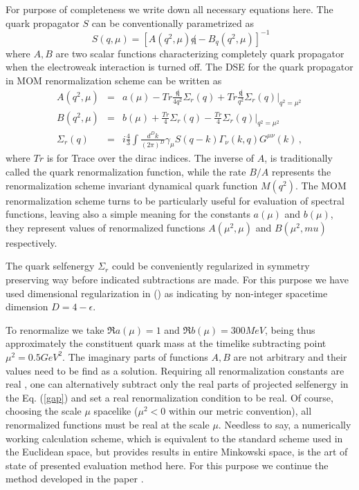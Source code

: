 \documentclass[aps,prd,superscriptaddress,eqsecnum,amsfonts,showpacs,epsfig]{revtex4}
\newcommand{\be}{\begin{equation}}
\newcommand{\ee}{\end{equation}}
\newcommand{\bea}{\begin{eqnarray}}
\newcommand{\eea}{\end{eqnarray}}
\newcommand{\nn}{\nonumber}
\begin{document}
 For purpose of completeness we write down all necessary equations here. 
The  quark propagator $S$ can be conventionally parametrized as
\be   \
S(q,\mu)=[A(q^2,\mu)\not q- B_q(q^2,\mu)]^{-1}
\ee
where  $A,B$ are two scalar functions characterizing completely  quark propagator when 
the electroweak interaction is turned off.
The DSE for the quark propagator in MOM renormalization scheme can be  written as
%
\bea  
A(q^2,\mu)&=&a(\mu)-Tr \frac{\not q}{4q^2}\Sigma_r(q)+ Tr \frac{\not q}{q^2}\Sigma_r(q)|_{q^2=\mu^2}
\nn \\
B(q^2,\mu)&=&b(\mu)+\frac{Tr}{4}\Sigma_r(q)- \frac{Tr}{4} \Sigma_r(q)|_{q^2=\mu^2}
\nn \\
 \label{gap}
\Sigma_r(q)&=&i\frac{4}{3}\int\frac{d^D k}{(2\pi)^D
} \gamma_{\mu} S(q-k) \Gamma_{\nu}(k,q) G^{\mu\nu}(k) \, ,
\eea
%
where $Tr$ is for Trace over the dirac indices.
 The inverse of $A$, is traditionally called the quark renormalization function, while the 
rate $B/A$ represents the renormalization scheme invariant  dynamical quark function $M(q^2)$. The MOM renormalization scheme 
turns to be particularly useful for  evaluation of spectral functions, leaving also a simple meaning for the constants $a(\mu)$ and $b(\mu)$, they represent values of renormalized functions $A(\mu^2,\mu)$ and $B(\mu^2,mu)$  respectively.

The quark selfenergy $\Sigma_r$ could be conveniently regularized in symmetry preserving way before indicated subtractions are made. 
For this purpose we have used dimensional regularization in (\cite{s1}) as indicating by non-integer spacetime dimension $D=4-\epsilon$.



To renormalize we  take $\Re a(\mu)=1$ and  $ \Re b(\mu)=300 MeV$, being thus approximately the  constituent quark mass at the timelike subtracting point $\mu^2=0.5 GeV^2$.  The imaginary parts of functions $A,B$ are not  arbitrary  and their values need to be find as a solution. Requiring all renormalization constants are real , one can alternatively  subtract only the real parts of projected selfenergy in the Eq. (\ref{gap}) and set  a real renormalization condition to be real. Of course, choosing the scale $\mu$ spacelike ($\mu^2<0$ within our metric convention), all renormalized functions must be real at the scale $\mu$. Needless to say, a numerically working calculation scheme, which is  equivalent to the standard scheme used in the Euclidean space, but provides results in entire Minkowski space, is the art of state of presented 
evaluation method here. For this purpose we continue  the method developed in the  paper \cite{s1}. 
  
\end{document}
